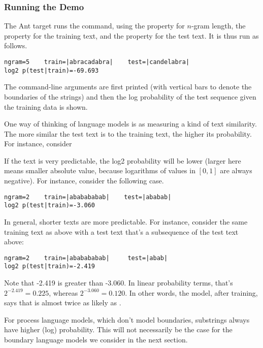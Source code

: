 \subsubsection{Running the Demo}

The Ant target  runs the command, using
the property  for $n$-gram length, the property
 for the training text, and the property
 for the test text.  It is thus run as
follows.
%
\begin{verbatim}
ngram=5    train=|abracadabra|    test=|candelabra|
log2 p(test|train)=-69.693
\end{verbatim}
%
The command-line arguments are first printed (with vertical bars to
denote the boundaries of the strings) and then the log probability of
the test sequence given the training data is shown.

One way of thinking of language models is as measuring a kind
of text similarity.  The more similar the test text is to the
training text, the higher its probability.  For instance, consider

If the text is very predictable, the log2 probability will be lower
(larger here means smaller absolute value, because logarithms of
values in $[0,1]$ are always negative).  For instance, consider
the following case.
%
\begin{verbatim}
ngram=2    train=|ababababab|    test=|ababab|
log2 p(test|train)=-3.060
\end{verbatim}

In general, shorter texts are more predictable.  For instance,
consider the same training text as above with a test text
that's a subsequence of the test text above:
%
\begin{verbatim}
ngram=2    train=|ababababab|     test=|abab|
log2 p(test|train)=-2.419
\end{verbatim}
%
Note that -2.419 is greater than -3.060.  In linear probability terms,
that's $2^{-2.419} = 0.225$, whereas $2^{-3.060} = 0.120$.  In other
words, the model, after training, says that  is
almost twice as likely as .

For process language models, which don't model boundaries, substrings
always have higher (log) probability.  This will not necessarily be
the case for the boundary language models we consider in the next section.

